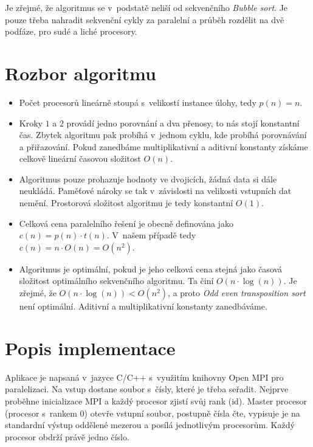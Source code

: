 \documentclass[11pt, a4paper, titlepage]{article}
\begin{document}
Je zřejmé, že algoritmus se v~podstatě neliší od sekvenčního \textit{Bubble sort}.
Je pouze třeba nahradit sekvenční cykly za paralelní a průběh rozdělit na dvě podfáze, pro sudé a liché procesory.


\section{Rozbor algoritmu}\label{sec:rozbor}

\begin{itemize}
    \item Počet procesorů lineárně stoupá s~velikostí instance úlohy, tedy $p(n) = n$.
    \item Kroky $1$ a $2$ provádí jedno porovnání a dva přenosy, to nás stojí konstantní čas.
          Zbytek algoritmu pak probíhá v~jednom cyklu, kde probíhá porovnávání a přiřazování.
          Pokud zanedbáme multiplikativní a aditivní konstanty získáme celkově lineární časovou složitost $O(n)$.
    \item Algoritmus pouze prohazuje hodnoty ve dvojicích, žádná data si dále neukládá.
          Paměťové nároky se tak v~závislosti na velikosti vstupních dat nemění.
          Prostorová složitost algoritmu je tedy konstantní $O(1)$.
    \item Celková cena paralelního řešení je obecně definována jako $c(n) = p(n) \cdot t(n)$.
          V~našem případě tedy $c(n) = n \cdot O(n) = O(n^2)$.
    \item Algoritmus je optimální, pokud je jeho celková cena stejná jako časová složitost optimálního sekvenčního algoritmu.
    Ta činí $O(n \cdot \log(n))$.
    Je zřejmé, že $O(n \cdot \log(n)) < O(n^2)$, a proto \textit{Odd even transposition sort} není optimální.
    Aditivní a multiplikativní konstanty zanedbáváme.
\end{itemize}


\section{Popis implementace}\label{sec:implementace}

Aplikace je napsaná v~jazyce C/C++ s~využitím knihovny Open MPI pro paralelizaci.
Na vstup dostane soubor s~čísly, které je třeba seřadit.
Nejprve proběhne inicializace MPI a každý procesor zjistí svůj rank (id).
Master procesor (procesor s~rankem 0) otevře vstupní soubor, postupně čísla čte, vypisuje je na standardní výstup oddělené mezerou a posílá jednotlivým procesorům.
Každý procesor obdrží právě jedno číslo.
\end{document}
